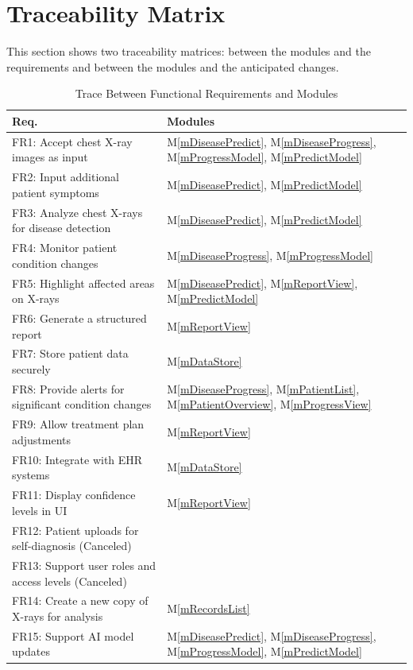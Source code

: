 \documentclass[12pt, titlepage]{article}
\newcommand{\mref}[1]{M\ref{#1}}
\begin{document}
\section{Traceability Matrix} \label{SecTM}

This section shows two traceability matrices: between the modules and the
requirements and between the modules and the anticipated changes.

\begin{table}[H]
\centering
\begin{tabular}{p{} p{}}
\toprule
\textbf{Req.} & \textbf{Modules}\\
\midrule
FR1: Accept chest X-ray images as input & \mref{mDiseasePredict}, \mref{mDiseaseProgress}, \mref{mProgressModel}, \mref{mPredictModel}\\
FR2: Input additional patient symptoms & \mref{mDiseasePredict}, \mref{mPredictModel}\\
FR3: Analyze chest X-rays for disease detection & \mref{mDiseasePredict}, \mref{mPredictModel}\\
FR4: Monitor patient condition changes & \mref{mDiseaseProgress}, \mref{mProgressModel}\\
FR5: Highlight affected areas on X-rays & \mref{mDiseasePredict}, \mref{mReportView}, \mref{mPredictModel}\\
FR6: Generate a structured report & \mref{mReportView}\\
FR7: Store patient data securely & \mref{mDataStore}\\
FR8: Provide alerts for significant condition changes & \mref{mDiseaseProgress}, \mref{mPatientList}, \mref{mPatientOverview}, \mref{mProgressView}\\
FR9: Allow treatment plan adjustments & \mref{mReportView}\\
FR10: Integrate with EHR systems & \mref{mDataStore}\\
FR11: Display confidence levels in UI & \mref{mReportView}\\
FR12: Patient uploads for self-diagnosis (Canceled) & \\
FR13: Support user roles and access levels (Canceled) & \\
FR14: Create a new copy of X-rays for analysis & \mref{mRecordsList}\\
FR15: Support AI model updates & \mref{mDiseasePredict}, \mref{mDiseaseProgress}, \mref{mProgressModel}, \mref{mPredictModel}\\
\bottomrule
\end{tabular}
\caption{Trace Between Functional Requirements and Modules}
\label{TblRT}
\end{table}
\end{document}
